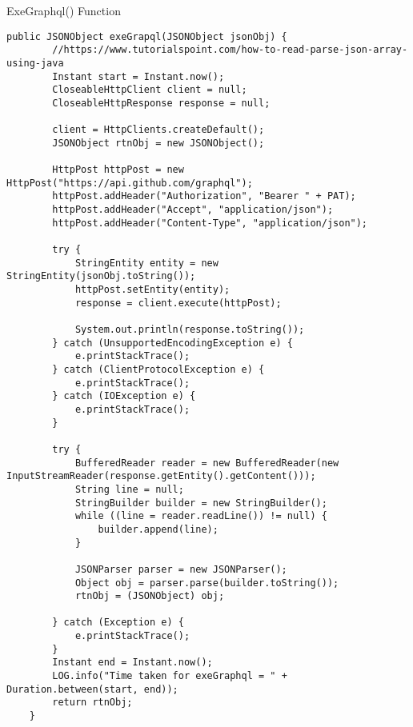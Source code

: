 ExeGraphql() Function
\begin{lstlisting}[breaklines]
public JSONObject exeGrapql(JSONObject jsonObj) {
        //https://www.tutorialspoint.com/how-to-read-parse-json-array-using-java
        Instant start = Instant.now();
        CloseableHttpClient client = null;
        CloseableHttpResponse response = null;

        client = HttpClients.createDefault();
        JSONObject rtnObj = new JSONObject();

        HttpPost httpPost = new HttpPost("https://api.github.com/graphql");
        httpPost.addHeader("Authorization", "Bearer " + PAT);
        httpPost.addHeader("Accept", "application/json");
        httpPost.addHeader("Content-Type", "application/json");

        try {
            StringEntity entity = new StringEntity(jsonObj.toString());
            httpPost.setEntity(entity);
            response = client.execute(httpPost);

            System.out.println(response.toString());
        } catch (UnsupportedEncodingException e) {
            e.printStackTrace();
        } catch (ClientProtocolException e) {
            e.printStackTrace();
        } catch (IOException e) {
            e.printStackTrace();
        }

        try {
            BufferedReader reader = new BufferedReader(new InputStreamReader(response.getEntity().getContent()));
            String line = null;
            StringBuilder builder = new StringBuilder();
            while ((line = reader.readLine()) != null) {
                builder.append(line);
            }

            JSONParser parser = new JSONParser();
            Object obj = parser.parse(builder.toString());
            rtnObj = (JSONObject) obj;

        } catch (Exception e) {
            e.printStackTrace();
        }
        Instant end = Instant.now();
        LOG.info("Time taken for exeGraphql = " + Duration.between(start, end));
        return rtnObj;
    }
\end{lstlisting}